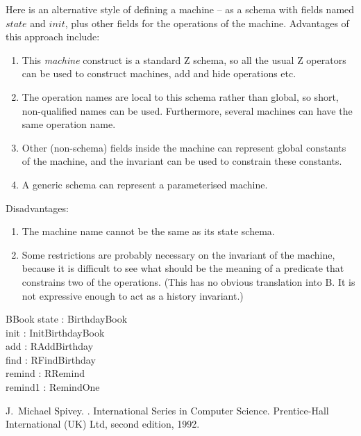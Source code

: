 \documentclass{article}
\begin{document}
  
Here is an alternative style of defining a machine -- as a
schema with fields named $state$ and $init$, plus other
fields for the operations of the machine.  
Advantages of this approach include:
\begin{enumerate}

\item This \emph{machine} construct is a standard Z schema, 
  so all the usual Z operators can be used to construct machines, 
  add and hide operations etc.  

\item The operation names are local to this schema rather than global, 
  so short, non-qualified names can be used.  Furthermore, several
  machines can have the same operation name.

\item Other (non-schema) fields inside the machine can represent
  global constants of the machine, and the invariant can be used
  to constrain these constants.

\item A generic schema can represent a parameterised machine.  
\end{enumerate}

Disadvantages: 
\begin{enumerate}
\item The machine name cannot be the same as its state schema.  
\item Some restrictions are probably necessary on the invariant
  of the machine, because it is difficult to see what should be
  the meaning of a predicate that constrains two of the operations.
  (This has no obvious translation into B.  It is not expressive
  enough to act as a history invariant.)
\end{enumerate}

\begin{schema}{BBook}
    state   : BirthdayBook \\
    init    : InitBirthdayBook \\
    add     : RAddBirthday \\
    find    : RFindBirthday \\
    remind  : RRemind \\
    remind1 : RemindOne
\end{schema}


% 

\begin{thebibliography}{1}
J.~Michael Spivey.
.
\newblock International Series in Computer Science. Prentice-Hall International
  (UK) Ltd, second edition, 1992.
\end{thebibliography}
\end{document}
